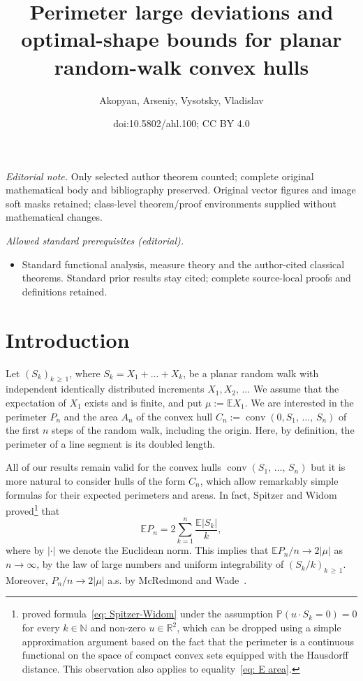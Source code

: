 \documentclass[10pt]{amsart}
\title{Perimeter large deviations and optimal-shape bounds for planar random-walk convex hulls}
\author{Akopyan, Arseniy, Vysotsky, Vladislav}
\date{doi:10.5802/ahl.100; CC BY 4.0}
\theoremstyle{definition}\newtheorem{defi}[theo]{Definition}\newtheorem{rema}[theo]{Remark}\newtheorem{exam}[theo]{Example}\newtheorem{exem}[theo]{Example}\newtheorem{nota}[theo]{Notation}
\DeclareMathOperator{\conv}{conv}
\newcommand{\Rbb}{\mathbb{R}}
\newcommand{\N}{\mathbb{N}}
\newcommand{\E}{\mathbb{E}}
\newcommand{\Pbb}{\mathbb{P}}
\begin{document}
\maketitle
\noindent\textit{Editorial note.} Only selected author theorem counted; complete original mathematical body and bibliography preserved. Original vector figures and image soft masks retained; class-level theorem/proof environments supplied without mathematical changes.\par\medskip
\noindent\textit{Allowed standard prerequisites (editorial).}\begin{itemize}
\item Standard functional analysis, measure theory and the author-cited classical theorems. Standard prior results stay cited; complete source-local proofs and definitions retained.
\end{itemize}\medskip

\section{Introduction} \label{Sec: intro}
Let $(S_k)_{k\,\ge\,1}$, where $S_k = X_1 + \ldots + X_k$, be a planar random walk with independent identically distributed increments $X_1, X_2,\,\ldots$ We assume that the expectation of $X_1$ exists and is finite, and put $\mu := \E X_1$. We are interested in the perimeter $P_n$ and the area $A_n$ of the convex hull $C_n:=\conv(0, S_1,\,\dots,\,S_n)$ of the first $n$ steps of the random walk, including the origin. Here, by definition, the perimeter of a line segment is its doubled length.

All of our results remain valid for the convex hulls $\conv(S_1,\,\dots,\,S_n)$ but it is more natural to consider hulls of the form $C_n$, which allow remarkably simple formulas for their expected perimeters and areas. In fact, Spitzer and Widom~\cite{SpitzerWidom} proved\footnote{\cite{SpitzerWidom} proved formula~\eqref{eq: Spitzer-Widom} under the assumption $\Pbb(u \cdot S_k=0)=0$ for every $k \in \N$ and non-zero $u \in \Rbb^2$, which can be dropped using a simple approximation argument based on the fact that the perimeter is a continuous functional on the space of compact convex sets equipped with the Hausdorff distance. This observation also applies to equality~\eqref{eq: E area}.} that
\begin{equation}\label{eq: Spitzer-Widom}
\E P_n = 2 \sum_{k=1}^n \frac{\E |S_k|}{k},
\end{equation}
where by $|\cdot|$ we denote the Euclidean norm. This implies that $\E P_n/n \to 2 |\mu|$ as $n \to \infty$, by the law of large numbers and uniform integrability of $(S_k/k)_{k\,\ge\,1}$. Moreover, $P_n/n \to 2|\mu|$ a.s. by McRedmond and Wade~\cite{McRedmondWade}.
\end{document}
